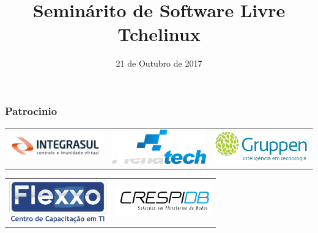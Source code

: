 

\def\alimentos{130}
\def\participantes{120}
\def\caridade{Banco de Alimentos\\ CAPS Joana D'Arc}
\def\palestrantes{Treze}
\def\palestras{Dezesseis}

\title{Seminárito de Software Livre Tchelinux}
\author{}
\date{21 de Outubro de 2017}




\coverframe

\begin{frame}
    \frametitle{Patrocinio}
\begin{center}
\begin{tabular}[h]{ccc}
\includegraphics[width=4.2cm]{images/integrasul.png} &
\includegraphics[width=4.2cm]{images/plenatech.png} &
\includegraphics[width=4.2cm]{images/gruppen.png}
\end{tabular}
\vfill
\begin{tabular}[h]{cc}
\includegraphics[width=4.2cm]{images/flexxo.png} &
\includegraphics[width=4.2cm]{images/crespidb.png}
\end{tabular}
\end{center}
\end{frame}

